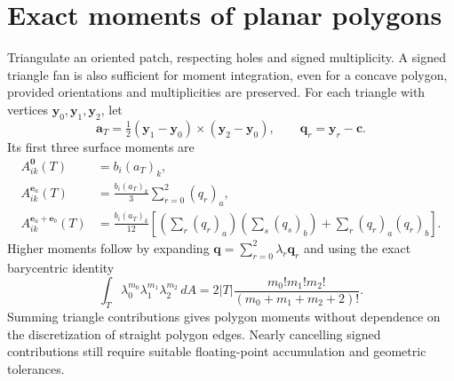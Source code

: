 \section{Exact moments of planar polygons}
Triangulate an oriented patch, respecting holes and signed multiplicity. A signed triangle fan is also sufficient for moment integration, even for a concave polygon, provided orientations and multiplicities are preserved. For each triangle with vertices $\bm y_0,\bm y_1,\bm y_2$, let
\begin{equation}
 \bm a_T=\tfrac12(\bm y_1-\bm y_0)\times(\bm y_2-\bm y_0),
 \qquad \bm q_r=\bm y_r-\bm c.
\end{equation}
Its first three surface moments are
\begin{align}
 A_{ik}^{\boldsymbol0}(T)&=b_i(a_T)_k,\\
 A_{ik}^{\bm e_a}(T)&=\frac{b_i(a_T)_k}{3}\sum_{r=0}^2(q_r)_a,\\
 A_{ik}^{\bm e_a+\bm e_b}(T)
 &=\frac{b_i(a_T)_k}{12}
 \left[\left(\sum_r(q_r)_a\right)\left(\sum_s(q_s)_b\right)
 +\sum_r(q_r)_a(q_r)_b\right].
 \label{eq:triangleSecondMoment}
\end{align}
Higher moments follow by expanding $\bm q=\sum_{r=0}^2\lambda_r\bm q_r$ and using the exact barycentric identity
\begin{equation}
 \int_T\lambda_0^{m_0}\lambda_1^{m_1}\lambda_2^{m_2}\,dA
 =2|T|\frac{m_0!m_1!m_2!}{(m_0+m_1+m_2+2)!}.
\end{equation}
Summing triangle contributions gives polygon moments without dependence on the discretization of straight polygon edges. Nearly cancelling signed contributions still require suitable floating-point accumulation and geometric tolerances.

